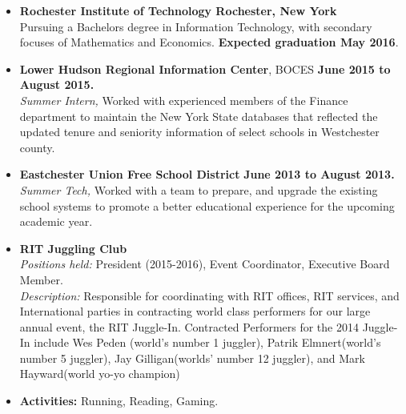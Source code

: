 \documentclass[11pt]{article}
\begin{document}
\vspace{1ex}
\begin{itemize}[topsep=1ex, itemsep=0ex, partopsep=0ex, parsep=1ex]
	\item[]{{\bf Rochester Institute of Technology \hfill Rochester, New York}}\\
Pursuing a Bachelors degree in Information Technology, with secondary focuses of Mathematics and Economics. {\bf Expected graduation May 2016}.
\end{itemize}
\vspace{1ex}
\begin{itemize} [topsep=.3ex, itemsep=0ex, partopsep=0ex, parsep=1ex]
	\item{{\bf Lower Hudson Regional Information Center}, BOCES \hfill {\bf June 2015 to August 2015.}}\\
	{\it Summer Intern,}
	Worked with experienced members of the Finance department to maintain the New York
	State databases that reflected the updated tenure and seniority information of select schools in Westchester county.
	\item{{\bf Eastchester Union Free School District} \hfill { \bf June 2013 to August 2013.}}\\
		{\it Summer Tech,}
		{Worked with a team to prepare, and upgrade the existing school systems to promote a better educational experience for the upcoming academic year.}
\end{itemize}

\vspace{1ex}
\begin{itemize} [topsep=.3ex, itemsep=0ex, partopsep=0ex, parsep=1ex]
	\item[] {\bf RIT Juggling Club}\\
	{\it Positions held:}  President (2015-2016), Event Coordinator, Executive Board Member.\\
	{\it Description:} Responsible for coordinating with RIT offices, RIT services, and International parties in contracting world class performers for our large annual event, the RIT Juggle-In. Contracted Performers for the 2014 Juggle-In include Wes Peden (world's number 1 juggler), Patrik Elmnert(world's number 5 juggler), Jay Gilligan(worlds' number 12 juggler), and Mark Hayward(world yo-yo champion)  	
	\item[] {\bf Activities:} Running, Reading, Gaming.
\end{itemize}
\end{document}

